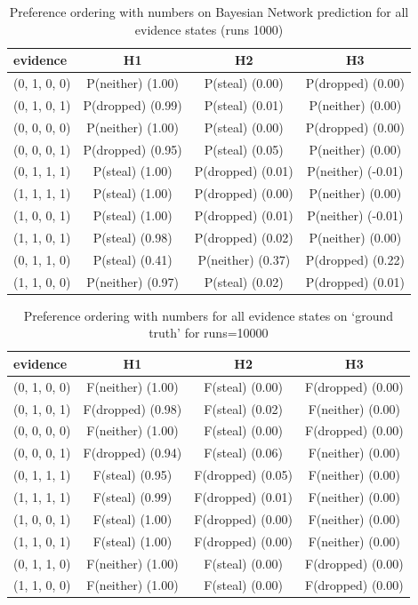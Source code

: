 \documentclass[11pt]{article}
\begin{document}
\begin{table}[htbp]
\begin{center}
\begin{tabular}{|l|c|c|c|}
\hline
evidence & H1 & H2 & H3 \\
\hline
(0, 1, 0, 0)&P(neither) (1.00) & P(steal) (0.00) & P(dropped) (0.00) \\
(0, 1, 0, 1)&P(dropped) (0.99) & P(steal) (0.01) & P(neither) (0.00) \\
(0, 0, 0, 0)&P(neither) (1.00) & P(steal) (0.00) & P(dropped) (0.00) \\
(0, 0, 0, 1)&P(dropped) (0.95) & P(steal) (0.05) & P(neither) (0.00) \\
(0, 1, 1, 1)&P(steal) (1.00) & P(dropped) (0.01) & P(neither) (-0.01) \\
(1, 1, 1, 1)&P(steal) (1.00) & P(dropped) (0.00) & P(neither) (0.00) \\
(1, 0, 0, 1)&P(steal) (1.00) & P(dropped) (0.01) & P(neither) (-0.01) \\
(1, 1, 0, 1)&P(steal) (0.98) & P(dropped) (0.02) & P(neither) (0.00) \\
(0, 1, 1, 0)&P(steal) (0.41) & P(neither) (0.37) & P(dropped) (0.22) \\
(1, 1, 0, 0)&P(neither) (0.97) & P(steal) (0.02) & P(dropped) (0.01) \\
\hline
\end{tabular}
\end{center}
\caption{ Preference ordering with numbers on Bayesian Network prediction for all evidence states (runs 1000)}
\label{somebody}
\end{table}
\begin{table}[htbp]
\begin{center}
\begin{tabular}{|l|c|c|c|}
\hline
evidence & H1 & H2 & H3 \\
\hline
(0, 1, 0, 0)&F(neither) (1.00) & F(steal) (0.00) & F(dropped) (0.00) \\
(0, 1, 0, 1)&F(dropped) (0.98) & F(steal) (0.02) & F(neither) (0.00) \\
(0, 0, 0, 0)&F(neither) (1.00) & F(steal) (0.00) & F(dropped) (0.00) \\
(0, 0, 0, 1)&F(dropped) (0.94) & F(steal) (0.06) & F(neither) (0.00) \\
(0, 1, 1, 1)&F(steal) (0.95) & F(dropped) (0.05) & F(neither) (0.00) \\
(1, 1, 1, 1)&F(steal) (0.99) & F(dropped) (0.01) & F(neither) (0.00) \\
(1, 0, 0, 1)&F(steal) (1.00) & F(dropped) (0.00) & F(neither) (0.00) \\
(1, 1, 0, 1)&F(steal) (1.00) & F(dropped) (0.00) & F(neither) (0.00) \\
(0, 1, 1, 0)&F(neither) (1.00) & F(steal) (0.00) & F(dropped) (0.00) \\
(1, 1, 0, 0)&F(neither) (1.00) & F(steal) (0.00) & F(dropped) (0.00) \\
\hline
\end{tabular}
\end{center}
\caption{ Preference ordering with numbers for all evidence states on `ground truth' for runs=10000}
\label{heretic}
\end{table}
\end{document}
